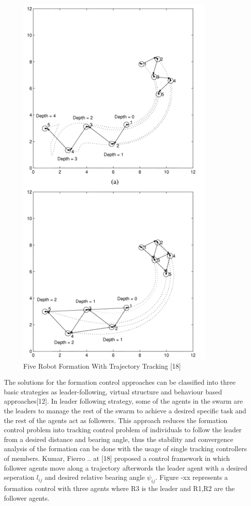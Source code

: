 \begin{figure}[H]
	\caption{Five Robot Formation With Trajectory Tracking [18]}
	\centering
	\includegraphics[scale = 1]{kumar}
\end{figure} 

The solutions for the formation control approaches can be classified into three basic strategies as leader-following, virtual structure and behaviour based approaches[12].  In leader following strategy, some of the agents in the swarm are the leaders to manage the rest of the swarm to achieve a desired specific task and the rest of the agents act as followers. This approach reduces the formation control problem into tracking control problem of individuals to follow the leader from a desired distance and bearing angle, thus the stability and convergence analysis of the formation can be done with the usage of single tracking controllers of members. Kumar, Fierro .. at [18] proposed a control framework in which follower agents move along a trajectory afterwords the leader agent with a desired seperation $l_{ij}$ and desired relative bearing angle $\psi_{ij}$.  Figure -xx represents a formation control with three agents where R3 is the leader and R1,R2 are the follower agents. 

